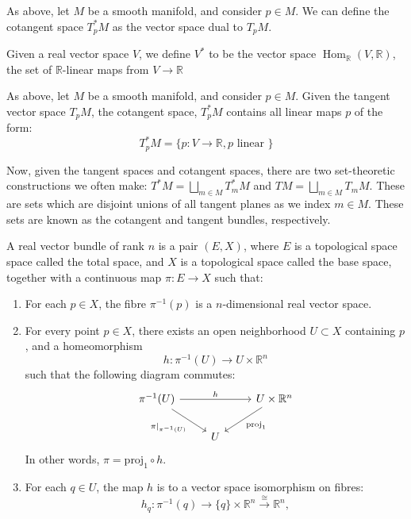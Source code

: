 As above, let $M$ be a smooth manifold, and consider $p \in M$. We can define the cotangent space $T_{p}^{*} M$ as the vector space dual to $T_{p} M$. 

\begin{defn}
Given a real vector space $V$, we define $V^{*}$ to be the vector space $\operatorname{Hom}_{\mathbb{R}}(V, \mathbb{R})$, the set of $\mathbb{R}$-linear maps from $V \to \mathbb{R}$
\end{defn}

\begin{defn}
As above, let $M$ be a smooth manifold, and consider $p \in M$. Given the tangent vector space $T_{p} M$, the cotangent space, $T^{*}_{p} M$ contains all linear maps $p$ of the form:
$$T_{p}^{*} M  = \{p: V \to \mathbb{R}, p \text{ linear } \}$$
\end{defn}

\noindent Now, given the tangent spaces and cotangent spaces, there are two set-theoretic constructions we often make: $T^{*}M = \bigsqcup_{m \in M} T^{*}_{m} M$ and $TM = \bigsqcup_{m \in M} T_{m} M$. These are sets which are disjoint unions of all tangent planes as we index $m \in M$. These sets are known as the cotangent and tangent bundles, respectively. 

\begin{defn}
A real vector bundle of rank \( n \) is a pair \( (E, X) \), where \( E \) is a topological space space called the total space, and \( X \) is a topological space called the base space, together with a continuous map \( \pi : E \to X \) such that:

\begin{enumerate}
    \item For each \( p \in X \), the fibre \( \pi^{-1}(p) \) is a \( n \)-dimensional real vector space.

    \item For every point \( p \in X \), there exists an open neighborhood \( U \subset X \) containing \( p \), and a homeomorphism
    \[
    h : \pi^{-1}(U) \to U \times \mathbb{R}^n
    \]
    such that the following diagram commutes:
    \[
    \begin{tikzcd}
    \pi^{-1}(U) \arrow[rr, "h"] \arrow[dr, "\pi|_{\pi^{-1}(U)}"'] & & U \times \mathbb{R}^n \arrow[dl, "\text{proj}_1"] \\
    & U &
    \end{tikzcd}
    \]
    In other words, \( \pi = \text{proj}_1 \circ h \).

    \item For each \( q \in U \), the map \( h \) is to a vector space isomorphism on fibres:
    \[
    h_q : \pi^{-1}(q) \to \{q\} \times \mathbb{R}^n \xrightarrow{\cong} \mathbb{R}^n,
    \]
\end{enumerate}
\end{defn}

